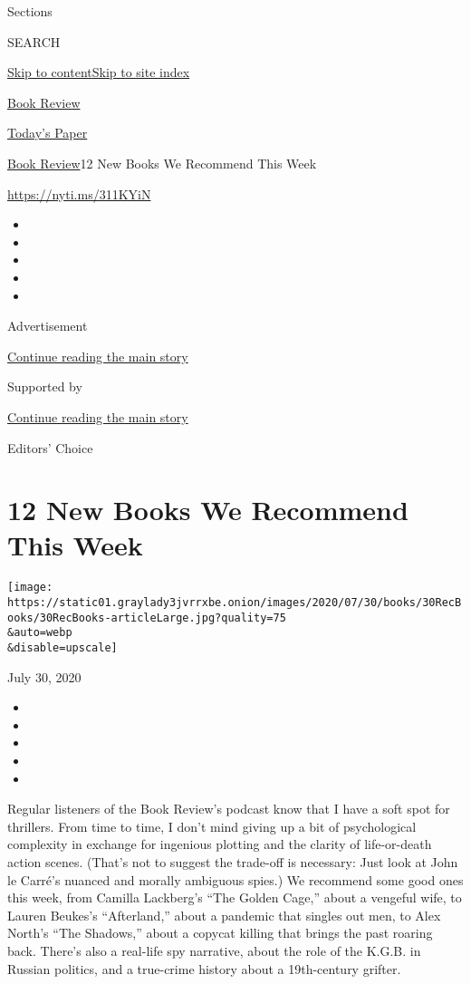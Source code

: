 Sections

SEARCH

\protect\hyperlink{site-content}{Skip to
content}\protect\hyperlink{site-index}{Skip to site index}

\href{https://www.nytimes3xbfgragh.onion/section/books/review}{Book
Review}

\href{https://myaccount.nytimes3xbfgragh.onion/auth/login?response_type=cookie\&client_id=vi}{}

\href{https://www.nytimes3xbfgragh.onion/section/todayspaper}{Today's
Paper}

\href{/section/books/review}{Book Review}\textbar{}12 New Books We
Recommend This Week

\url{https://nyti.ms/311KYiN}

\begin{itemize}
\item
\item
\item
\item
\item
\end{itemize}

Advertisement

\protect\hyperlink{after-top}{Continue reading the main story}

Supported by

\protect\hyperlink{after-sponsor}{Continue reading the main story}

Editors' Choice

\hypertarget{12-new-books-we-recommend-this-week}{%
\section{12 New Books We Recommend This
Week}\label{12-new-books-we-recommend-this-week}}

\texttt{[image: https://static01.graylady3jvrrxbe.onion/images/2020/07/30/books/30RecBooks/30RecBooks-articleLarge.jpg?quality=75\\\&auto=webp\\\&disable=upscale]}

July 30, 2020

\begin{itemize}
\item
\item
\item
\item
\item
\end{itemize}

Regular listeners of the Book Review's podcast know that I have a soft
spot for thrillers. From time to time, I don't mind giving up a bit of
psychological complexity in exchange for ingenious plotting and the
clarity of life-or-death action scenes. (That's not to suggest the
trade-off is necessary: Just look at John le Carré's nuanced and morally
ambiguous spies.) We recommend some good ones this week, from Camilla
Lackberg's ``The Golden Cage,'' about a vengeful wife, to Lauren
Beukes's ``Afterland,'' about a pandemic that singles out men, to Alex
North's ``The Shadows,'' about a copycat killing that brings the past
roaring back. There's also a real-life spy narrative, about the role of
the K.G.B. in Russian politics, and a true-crime history about a
19th-century grifter.

